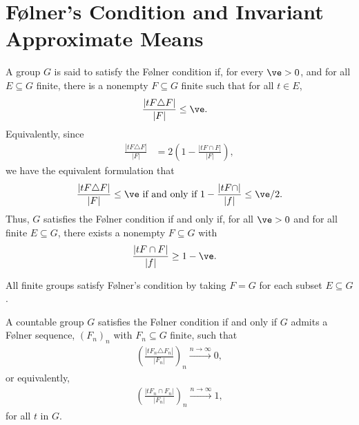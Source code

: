 \documentclass[10pt]{mypackage}
\begin{document}
\section{Følner's Condition and Invariant Approximate Means}%
\begin{definition}
  A group $G$ is said to satisfy the Følner condition if, for every $\ve > 0$, and for all $E\subseteq G$ finite, there is a nonempty $F\subseteq G$ finite such that for all $t\in E$,
  \begin{align*}
    \frac{\left\vert tF\triangle F \right\vert}{\left\vert F \right\vert} &\leq \ve.
  \end{align*}
  Equivalently, since
  \begin{align*}
    \frac{\left\vert tF\triangle F \right\vert}{\left\vert F \right\vert} &= 2\left(1-\frac{\left\vert tF\cap F \right\vert}{\left\vert F \right\vert}\right),
  \end{align*}
  we have the equivalent formulation that
  \begin{align*}
    \frac{\left\vert tF\triangle F \right\vert}{\left\vert F \right\vert} \leq \ve \text{ if and only if } 1-\frac{\left\vert tF\cap  \right\vert}{\left\vert f \right\vert} \leq \ve/2.
  \end{align*}
  Thus, $G$ satisfies the Følner condition if and only if, for all $\ve > 0$ and for all finite $E\subseteq G$, there exists a nonempty $F\subseteq G$ with
  \begin{align*}
    \frac{\left\vert tF\cap F \right\vert}{\left\vert f \right\vert} &\geq 1-\ve.
  \end{align*}
\end{definition}
\begin{example}
  All finite groups satisfy Følner's condition by taking $F = G$ for each subset $E\subseteq G$.
\end{example}
\begin{lemma}
  A countable group $G$ satisfies the Følner condition if and only if $G$ admits a Følner sequence, $\left(F_n\right)_n$ with $F_n\subseteq G$ finite, such that
  \begin{align*}
    \left(\frac{\left\vert tF_n\triangle F_n \right\vert}{\left\vert F_n \right\vert}\right)_n \xrightarrow{n\rightarrow\infty} 0,
  \end{align*}
  or equivalently,
  \begin{align*}
    \left(\frac{\left\vert tF_n\cap F_n \right\vert}{\left\vert F_n \right\vert}\right)_n \xrightarrow{n\rightarrow\infty}1,
  \end{align*}
  for all $t$ in $G$.
\end{lemma}
\end{document}
